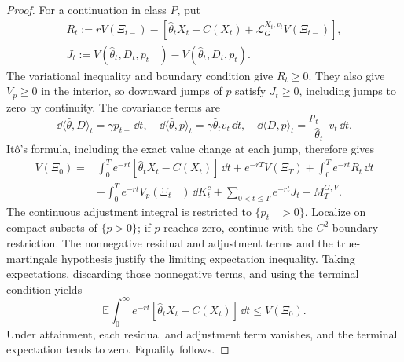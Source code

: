 \documentclass[12pt]{article}
\newcommand{\E}{\mathbb{E}}
\newcommand{\hth}{\hat\theta}
\begin{document}
\begin{proof}
For a continuation in class \(P\), put
\[
\begin{gathered}
  R_t:=rV(\Xi_{t-})-
     [\hth_tX_t-C(X_t)+\mathcal L_G^{X_t,v_t}V(\Xi_{t-})],
  \\
  J_t:=V(\hth_t,D_t,p_{t-})-V(\hth_t,D_t,p_t).
\end{gathered}
\]
The variational inequality and boundary condition give \(R_t\geq0\).
They also give \(V_p\geq0\) in the interior, so downward jumps of
\(p\) satisfy \(J_t\geq0\), including jumps to zero by continuity.
The covariance terms are
\[
  \dd\langle\hth,D\rangle_t=\gamma p_{t-}\,\dd t,
  \quad \dd\langle\hth,p\rangle_t=\gamma\hth_tv_t\,\dd t,
  \quad \dd\langle D,p\rangle_t
             =\frac{p_{t-}}{\hth_t}v_t\,\dd t.
\]
It\^o's formula, including the exact value change at each jump,
therefore gives
\begin{equation}\label{eq:gbm-verification-identity}
\begin{aligned}
  V(\Xi_0)={}&\int_0^T e^{-rt}
       [\hth_tX_t-C(X_t)]\,\dd t+e^{-rT}V(\Xi_T)
       +\int_0^T e^{-rt}R_t\,\dd t\\
      &+\int_0^T e^{-rt}V_p(\Xi_{t-})\,\dd K_t^c
       +\sum_{0<t\leq T}e^{-rt}J_t-M_T^{G,V}.
\end{aligned}
\end{equation}
The continuous adjustment integral is restricted to
\(\{p_{t-}>0\}\). Localize on compact subsets of \(\{p>0\}\);
if \(p\) reaches zero, continue with the \(C^2\) boundary
restriction. The nonnegative residual and adjustment terms and the
true-martingale hypothesis justify the limiting expectation
inequality. Taking expectations, discarding those nonnegative terms,
and using the terminal condition yields
\[
  \E\int_0^\infty e^{-rt}
       [\hth_tX_t-C(X_t)]\,\dd t\leq V(\Xi_0).
\]
Under attainment, each residual and adjustment term vanishes, and
the terminal expectation tends to zero. Equality follows.


\end{proof}
\end{document}
